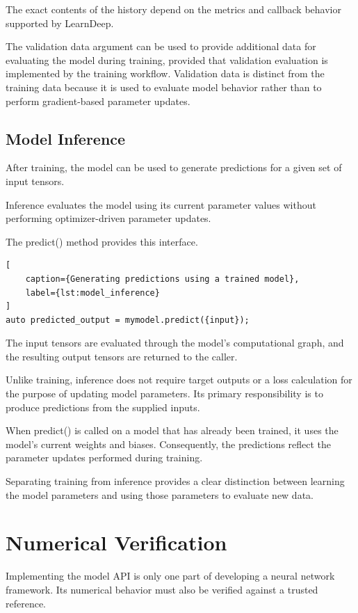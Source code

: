 The exact contents of the history depend on the metrics
and callback behavior supported by LearnDeep.

The validation data argument can be used to provide
additional data for evaluating the model during training,
provided that validation evaluation is implemented by
the training workflow. Validation data is distinct from
the training data because it is used to evaluate model
behavior rather than to perform gradient-based parameter
updates.


\subsection{Model Inference}

After training, the model can be used to generate
predictions for a given set of input tensors.

Inference evaluates the model using its current parameter
values without performing optimizer-driven parameter
updates.

The predict() method provides this interface.

\begin{lstlisting}[
    caption={Generating predictions using a trained model},
    label={lst:model_inference}
]
auto predicted_output = mymodel.predict({input});
\end{lstlisting}

The input tensors are evaluated through the model's
computational graph, and the resulting output tensors
are returned to the caller.

Unlike training, inference does not require target outputs
or a loss calculation for the purpose of updating model
parameters. Its primary responsibility is to produce
predictions from the supplied inputs.

When predict() is called on a model that has already
been trained, it uses the model's current weights and
biases. Consequently, the predictions reflect the
parameter updates performed during training.

Separating training from inference provides a clear
distinction between learning the model parameters and
using those parameters to evaluate new data.


\section{Numerical Verification}

Implementing the model API is only one part of developing
a neural network framework. Its numerical behavior must
also be verified against a trusted reference.

